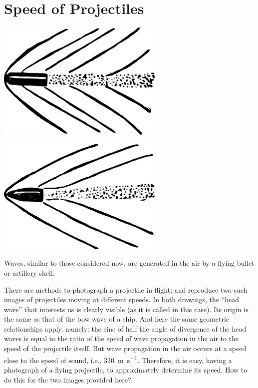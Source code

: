 \section{Speed of Projectiles}
\label{sec-2.14}
\begin{marginfigure}[-3cm]%
\centering
\includegraphics[width=0.6\textwidth]{figures/ch-02/fig-050.pdf}
\end{marginfigure}

\begin{marginfigure}[1cm]%
\centering
\includegraphics[width=0.6\textwidth]{figures/ch-02/fig-051.pdf}
\end{marginfigure}

\ques Waves, similar to those considered now, are generated in the air by a flying bullet or artillery shell.

There are methods to photograph a projectile in flight;  and  reproduce two such images of projectiles moving at different speeds. In both drawings, the ``head wave'' that interests us is clearly visible (as it is called in this case). Its origin is the same as that of the bow wave of a ship. And here the same geometric relationships apply, namely: the sine of half the angle of divergence of the head waves is equal to the ratio of the speed of wave propagation in the air to the speed of the projectile itself. But wave propagation in the air occurs at a speed close to the speed of sound, i.e., \SI{330}{\meter\per\second}. Therefore, it is easy, having a photograph of a flying projectile, to approximately determine its speed. How to do this for the two images provided here?

